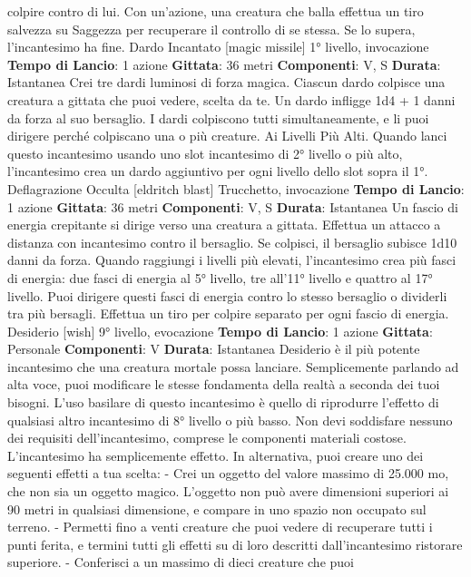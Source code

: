 \begin{multicols}{2}
colpire contro di lui. Con un’azione, una creatura che
balla effettua un tiro salvezza su Saggezza per
recuperare il controllo di se stessa. Se lo supera,
l’incantesimo ha fine.
Dardo Incantato
[magic missile]
1° livello, invocazione
\textbf{Tempo di Lancio}: 1 azione
\textbf{Gittata}: 36 metri
\textbf{Componenti}: V, S
\textbf{Durata}: Istantanea
Crei tre dardi luminosi di forza magica. Ciascun dardo
colpisce una creatura a gittata che puoi vedere, scelta
da te. Un dardo infligge 1d4 + 1 danni da forza al suo
bersaglio. I dardi colpiscono tutti simultaneamente, e li
puoi dirigere perché colpiscano una o più creature.
Ai Livelli Più Alti. Quando lanci questo incantesimo
usando uno slot incantesimo di 2° livello o più alto,
l’incantesimo crea un dardo aggiuntivo per ogni livello
dello slot sopra il 1°.
Deflagrazione Occulta
[eldritch blast]
Trucchetto, invocazione
\textbf{Tempo di Lancio}: 1 azione
\textbf{Gittata}: 36 metri
\textbf{Componenti}: V, S
\textbf{Durata}: Istantanea
Un fascio di energia crepitante si dirige verso una
creatura a gittata. Effettua un attacco a distanza con 
incantesimo contro il bersaglio. Se colpisci, il bersaglio
subisce 1d10 danni da forza.
Quando raggiungi i livelli più elevati, l’incantesimo crea
più fasci di energia: due fasci di energia al 5° livello, tre
all’11° livello e quattro al 17° livello. Puoi dirigere questi
fasci di energia contro lo stesso bersaglio o dividerli tra
più bersagli. Effettua un tiro per colpire separato per
ogni fascio di energia.
Desiderio
[wish]
9° livello, evocazione
\textbf{Tempo di Lancio}: 1 azione
\textbf{Gittata}: Personale
\textbf{Componenti}: V
\textbf{Durata}: Istantanea
Desiderio è il più potente incantesimo che una creatura
mortale possa lanciare. Semplicemente parlando ad
alta voce, puoi modificare le stesse fondamenta della
realtà a seconda dei tuoi bisogni.
L’uso basilare di questo incantesimo è quello di
riprodurre l’effetto di qualsiasi altro incantesimo di 8°
livello o più basso. Non devi soddisfare nessuno dei
requisiti dell’incantesimo, comprese le componenti
materiali costose. L’incantesimo ha semplicemente
effetto.
In alternativa, puoi creare uno dei seguenti effetti a tua
scelta:
- Crei un oggetto del valore massimo di 25.000 mo,
che non sia un oggetto magico. L’oggetto non può
avere dimensioni superiori ai 90 metri in qualsiasi
dimensione, e compare in uno spazio non occupato
sul terreno.
- Permetti fino a venti creature che puoi vedere di
recuperare tutti i punti ferita, e termini tutti gli effetti
su di loro descritti dall’incantesimo ristorare
superiore.
- Conferisci a un massimo di dieci creature che puoi

\end{multicols}
